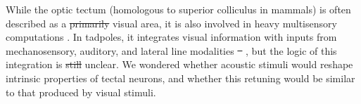 \documentclass{article}
\providecommand{\DIFaddtex}[1]{{\protect\color{blue}\uwave{#1}}} %
\providecommand{\DIFdeltex}[1]{{\protect\color{red}\sout{#1}}}                      %
\providecommand{\DIFaddbegin}{} %
\providecommand{\DIFaddend}{} %
\providecommand{\DIFdelbegin}{} %
\providecommand{\DIFdelend}{} %
\providecommand{\DIFadd}[1]{\texorpdfstring{\DIFaddtex{#1}}{#1}} %
\providecommand{\DIFdel}[1]{\texorpdfstring{\DIFdeltex{#1}}{}} %
\newcommand{\DIFscaledelfig}{0.5}
\newlength{\DIFdelgraphicswidth} %
\newlength{\DIFdelgraphicsheight} %
\newcommand{\DIFaddincludegraphics}[2][]{{\color{blue}\fbox{\DIFOincludegraphics[#1]{#2}}}} %
\newcommand{\DIFdelincludegraphics}[2][]{%
\sbox{\DIFdelgraphicsbox}{\DIFOincludegraphics[#1]{#2}}%
\settoboxwidth{\DIFdelgraphicswidth}{\DIFdelgraphicsbox} %
\settoboxtotalheight{\DIFdelgraphicsheight}{\DIFdelgraphicsbox} %
\scalebox{\DIFscaledelfig}{%
\parbox[b]{\DIFdelgraphicswidth}{\usebox{\DIFdelgraphicsbox}\\[-\baselineskip] \rule{\DIFdelgraphicswidth}{0em}}\llap{\resizebox{\DIFdelgraphicswidth}{\DIFdelgraphicsheight}{%
\setlength{\unitlength}{\DIFdelgraphicswidth}%
\begin{picture}(1,1)%
\thicklines\linethickness{2pt} %
{\color[rgb]{1,0,0}\put(0,0){\framebox(1,1){}}}%
{\color[rgb]{1,0,0}\put(0,0){\line( 1,1){1}}}%
{\color[rgb]{1,0,0}\put(0,1){\line(1,-1){1}}}%
\end{picture}%
}\hspace*{3pt}}} %
} %
\DeclareRobustCommand{\DIFaddbegin}{\DIFOaddbegin \let\includegraphics\DIFaddincludegraphics} %
\DeclareRobustCommand{\DIFaddend}{\DIFOaddend \let\includegraphics\DIFOincludegraphics} %
\DeclareRobustCommand{\DIFdelbegin}{\DIFOdelbegin \let\includegraphics\DIFdelincludegraphics} %
\DeclareRobustCommand{\DIFdelend}{\DIFOaddend \let\includegraphics\DIFOincludegraphics} %
\begin{document}
While the optic tectum (homologous to superior colliculus in mammals) is often described as a \DIFdelbegin \DIFdel{primarily }\DIFdelend visual area, it is also involved in heavy multisensory computations \citep{stein2014}. In tadpoles, it integrates visual information with inputs from mechanosensory, auditory, and lateral line modalities \DIFdelbegin \DIFdel{\mbox{%
\citep{deeg2009,pratt2009,hiramoto2009,felch2016,truszkowski2017}}\hspace{0pt}%
}\DIFdelend \DIFaddbegin \DIFadd{\mbox{%
\citep{deeg2009,pratt2009trigeminal,hiramoto2009,felch2016,truszkowski2017}}\hspace{0pt}%
}\DIFaddend , but the logic of this integration is \DIFdelbegin \DIFdel{still }\DIFdelend unclear. We wondered whether acoustic stimuli would reshape intrinsic properties of tectal neurons, and whether this retuning would be similar to that produced by visual stimuli. 
\end{document}
